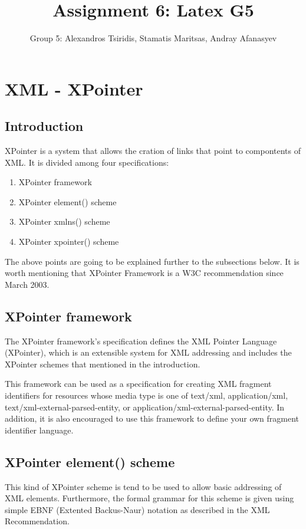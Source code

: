 \documentclass[11pt]{article}
\title{Assignment 6: Latex G5}
\author{Group 5: Alexandros Tsiridis, Stamatis Maritsas, Andray Afanasyev}
\date{}
\begin{document}
\maketitle

\section{XML - XPointer}
\subsection{Introduction}
XPointer is a system that allows the cration of links that point to compontents of XML. It is divided among four specifications:
\begin{enumerate}
\item XPointer framework
\item XPointer element() scheme
\item XPointer xmlns() scheme
\item XPointer xpointer() scheme
\end{enumerate}
The above points are going to be explained further to the subsections below. It is worth mentioning that XPointer Framework is a W3C recommendation since March 2003.

\subsection{XPointer framework}

The XPointer framework's specification defines the XML Pointer Language (XPointer), which is an extensible system for XML addressing and includes the XPointer schemes that mentioned in the introduction.

This framework can be used as a specification for creating XML fragment identifiers for resources whose media type is one of text/xml, application/xml, text/xml-external-parsed-entity, or application/xml-external-parsed-entity. In addition, it is also encouraged to use this framework to define your own fragment identifier language. \cite{xpointerframework}

\subsection{XPointer element() scheme}

This kind of XPointer scheme is tend to be used to allow basic addressing of XML elements. Furthermore, the formal grammar for this scheme is given using simple EBNF (Extented Backus-Naur) notation as described in the XML Recommendation.\cite{elementscheme}
\end{document}
